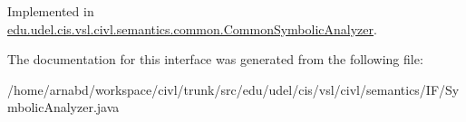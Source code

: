Implemented in \hyperlink{classedu_1_1udel_1_1cis_1_1vsl_1_1civl_1_1semantics_1_1common_1_1CommonSymbolicAnalyzer_af88928932b58406b4a5dac52fb709070}{edu.\+udel.\+cis.\+vsl.\+civl.\+semantics.\+common.\+Common\+Symbolic\+Analyzer}.



The documentation for this interface was generated from the following file\+:\begin{DoxyCompactItemize}
\item 
/home/arnabd/workspace/civl/trunk/src/edu/udel/cis/vsl/civl/semantics/\+I\+F/Symbolic\+Analyzer.\+java\end{DoxyCompactItemize}
